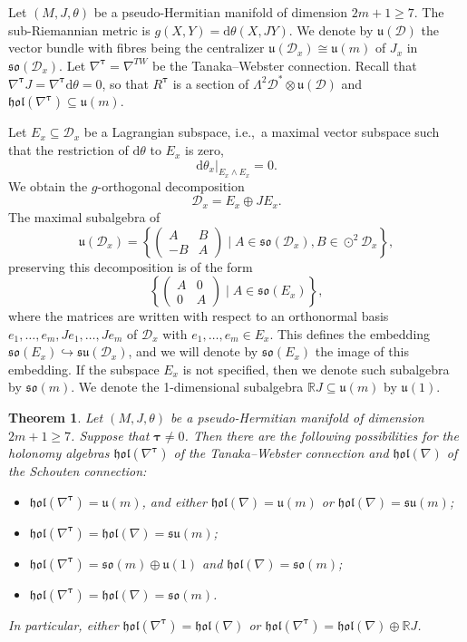 \documentclass{amsart}
\theoremstyle{plain}
\newtheorem{theorem}{Theorem}[section]
\theoremstyle{definition}
\def\so{\mathfrak{so}}
\def\su{\mathfrak{su}}
\def\u{\mathfrak{u}}
\newcommand{\hol}{\mathfrak{hol}}
\newcommand{\bt}{{\boldsymbol{\tau}}}
\newcommand{\Real}{\mathbb{R}}
\newcommand{\1}{\mathbf{1}}
\newcommand{\D}{{\mathcal D}}
\renewcommand{\d}{\mathrm{d}}
\newcommand{\+}{\oplus}
\begin{document}
Let $(M,J,\theta)$ be a pseudo-Hermitian manifold of dimension $2m+1\geq 7$. 
The sub-Riemannian metric is $g(X,Y)=\d\theta(X,JY)$.
 We denote by $\u(\D)$ the 
vector bundle with fibres being the centralizer $\u(\D_x)\cong\u(m)$ of $J_x$ in  $\so(\D_x)$.
Let $\nabla^\bt=\nabla^{TW}$ be the Tanaka--Webster connection. Recall that $\nabla^\bt J=\nabla^\bt\d\theta=0$, so that $R^\bt$ is a section of $\Lambda^2\D^*\otimes \u(\D)$ and $\hol(\nabla^\bt)\subseteq\u(m)$.




Let $E_x\subseteq \D_x$ be a Lagrangian subspace, i.e.,~a maximal vector subspace such that the restriction of $\d\theta$ to $E_x$ is zero, 
\[ \d\theta_x|_{E_x\wedge E_x}=0.\]
We obtain the  $g$-orthogonal decomposition
$$\D_x=E_x\oplus JE_x.$$
The maximal subalgebra of  
\[\u (\D_x)= \left\{ \begin{pmatrix} A&B \\-B &A\end{pmatrix} \mid A\in \so(\D_x), B\in \odot^2 \D_x\right\},\] 
 preserving this decomposition is of the form 
$$\left\{\left(\begin{matrix}
A&0\\0&A
\end{matrix} \right)\mid A\in\so(E_x) \right\},$$
where the matrices are written with respect to an orthonormal basis $e_1,\dots,e_m,Je_1,\dots,Je_m$ of $\D_x$ with $e_1,\dots,e_m\in E_x$. 
This defines the embedding $\so(E_x)\hookrightarrow\su (\D_x)$, and we will denote by $\so(E_x)$ the image of this embedding. If the subspace $E_x$ is not specified, then we denote such subalgebra by $\so(m)$. We denote the 1-dimensional subalgebra $\Real J\subseteq\u(m)$ by $\u(1)$.



\begin{theorem} \label{ThClass} Let $(M,J,\theta)$ be a pseudo-Hermitian manifold of dimension $2m+1\geq 7$. Suppose that $\bt\neq 0$. Then there are the following possibilities for the  holonomy algebras $\hol(\nabla^\bt)$ of the Tanaka--Webster connection and $\hol(\nabla)$ of the Schouten connection: 
	\begin{itemize}
		\item[ 1.] $\hol(\nabla^\bt)=\u(m)$, and either $\hol(\nabla)=\u(m)$ or $\hol(\nabla)=\su(m)$;
		\item[ 2.] $\hol(\nabla^\bt)=\hol(\nabla)=\su(m)$;
		\item[ 3.] $\hol(\nabla^\bt)=\so(m)\oplus\u(1)$ and $\hol(\nabla)=\so(m)$; 
		\item[ 4.] $\hol(\nabla^\bt)=\hol(\nabla)=\so(m)$.
	\end{itemize}
	In particular, either $\hol(\nabla^\bt)=\hol(\nabla)$ or $\hol(\nabla^\bt)=\hol(\nabla)\+\Real J$.
\end{theorem}
\end{document}
